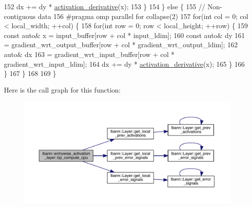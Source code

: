 \begin{DoxyCode}
152         dx += dy * \hyperlink{classlbann_1_1entrywise__activation__layer_a7676a4c5060452a38264993554e79f8e}{activation\_derivative}(x);
153       \}
154     \} \textcolor{keywordflow}{else} \{
155       \textcolor{comment}{// Non-contiguous data}
156 \textcolor{preprocessor}{      #pragma omp parallel for collapse(2)}
157       \textcolor{keywordflow}{for}(\textcolor{keywordtype}{int} col = 0; col < local\_width; ++col) \{
158         \textcolor{keywordflow}{for}(\textcolor{keywordtype}{int} row = 0; row < local\_height; ++row) \{
159           \textcolor{keyword}{const} \textcolor{keyword}{auto}& x = input\_buffer[row + col * input\_ldim];
160           \textcolor{keyword}{const} \textcolor{keyword}{auto}& dy
161             = gradient\_wrt\_output\_buffer[row + col * gradient\_wrt\_output\_ldim];
162           \textcolor{keyword}{auto}& dx
163             = gradient\_wrt\_input\_buffer[row + col * gradient\_wrt\_input\_ldim];
164           dx += dy * \hyperlink{classlbann_1_1entrywise__activation__layer_a7676a4c5060452a38264993554e79f8e}{activation\_derivative}(x);
165         \}
166       \}
167     \}
168 
169   \}
\end{DoxyCode}
Here is the call graph for this function\+:\nopagebreak
\begin{figure}[H]
\begin{center}
\leavevmode
\includegraphics[width=350pt]{classlbann_1_1entrywise__activation__layer_a38c2c090f26fb8ca269bef45989564a5_cgraph}
\end{center}
\end{figure}
\mbox{\label{classlbann_1_1entrywise__activation__layer_a569674cb4c0f50ea76acc0733fc53ba9}} 
